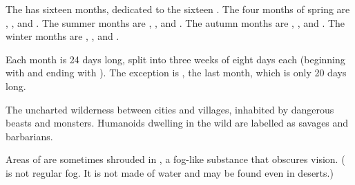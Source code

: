 \begin{gloss}
\begin{subgloss}
  The \ImperialCalendar{} has sixteen months, dedicated to the sixteen \Sephiroth{}.
  The four months of spring are \Atzirah{}, \Razilah, \Keshirah{} and \Feazirah{}. 
  The summer months are \Barion{}, \Teshiron, \Izion{} and \Hapheron. 
  The autumn months are \Thimared, \Yemared, \Cushed{} and \Hoshied. 
  The winter months are \Omariel, \Yeziel, \Ishiel{} and \Gamishiel. 
  
  Each month is 24 days long, split into three weeks of eight days each (beginning with \Corjin{} and ending with \Siljin). 
  The exception is \Gamishiel{}, the last month, which is only 20 days long. %
  \also{\Sephiroth}
\end{subgloss}








\begin{comment}
\paragraph{\Wylde}
\end{comment}
\gitemthe{\Wylde}
The uncharted wilderness between cities and villages, inhabited by dangerous beasts and monsters. 
Humanoids dwelling in the wild are labelled as savages and barbarians. 

\index{\wildfog}
Areas of \Wylde{} are sometimes shrouded in \wildfog, a fog-like substance that obscures vision. 
(\Wildfog{} is not regular fog. 
It is not made of water and may be found even in deserts.) 



\end{gloss}



